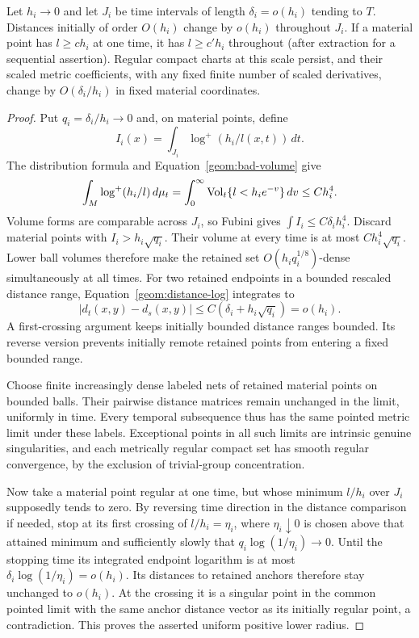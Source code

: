 \begin{lemma}\label{geom:slow-motion}
Let $h_i\to0$ and let $J_i$ be time intervals of length
$\delta_i=o(h_i)$ tending to $T$. Distances initially of order
$O(h_i)$ change by $o(h_i)$ throughout $J_i$. If a material point
has $l\geq c h_i$ at one time, it has $l\geq c' h_i$ throughout
(after extraction for a sequential assertion). Regular compact
charts at this scale persist, and their scaled metric coefficients,
with any fixed finite number of scaled derivatives, change by
$O(\delta_i/h_i)$ in fixed material coordinates.
\end{lemma}

\begin{proof}
Put $q_i=\delta_i/h_i\to0$ and, on material points, define
\[
 I_i(x)=\int_{J_i}\log^+(h_i/l(x,t))\,dt.
\]
The distribution formula and Equation~\eqref{geom:bad-volume} give
\[
 \int_M\log^+(h_i/l)\,d\mu_t
 =\int_0^\infty\operatorname{Vol}_t\{l<h_ie^{-v}\}\,dv\leq Ch_i^4.
\]
Volume forms are comparable across $J_i$, so Fubini gives
$\int I_i\leq C\delta_i h_i^4$. Discard material points with
$I_i>h_i\sqrt{q_i}$. Their volume at every time is at most
$Ch_i^4\sqrt{q_i}$. Lower ball volumes therefore make the retained
set $O(h_iq_i^{1/8})$-dense simultaneously at all times.
For two retained endpoints in a bounded rescaled distance range,
Equation~\eqref{geom:distance-log} integrates to
\[
 |d_t(x,y)-d_s(x,y)|
 \leq C(\delta_i+h_i\sqrt{q_i})=o(h_i).
\]
A first-crossing argument keeps initially bounded distance ranges
bounded. Its reverse version prevents initially remote retained
points from entering a fixed bounded range.

Choose finite increasingly dense labeled nets of retained material
points on bounded balls. Their pairwise distance matrices remain
unchanged in the limit, uniformly in time. Every temporal
subsequence thus has the same pointed metric limit under these
labels. Exceptional points in all such limits are intrinsic genuine
singularities, and each metrically regular compact set has smooth
regular convergence, by the exclusion of trivial-group concentration.

Now take a material point regular at one time, but whose minimum
$l/h_i$ over $J_i$ supposedly tends to zero. By reversing time
direction in the distance comparison if needed, stop at its first
crossing of $l/h_i=\eta_i$, where $\eta_i\downarrow0$ is chosen
above that attained minimum and sufficiently slowly that
$q_i\log(1/\eta_i)\to0$. Until the stopping time its integrated
endpoint logarithm is at most
$\delta_i\log(1/\eta_i)=o(h_i)$. Its distances to retained anchors
therefore stay unchanged to $o(h_i)$. At the crossing it is a
singular point in the common pointed limit with the same anchor
distance vector as its initially regular point, a contradiction.
This proves the asserted uniform positive lower radius.


\end{proof}
